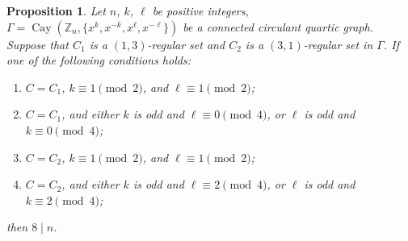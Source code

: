 \documentclass[12pt]{article}
\newtheorem{propA}{Proposition}[subsection]
\begin{document}
  \begin{propA}\label{prop:4-nkll}
  	Let $n$, $k$, $\ell$ be positive integers,
  	$\Gamma=\operatorname{Cay}(\mathbb{Z}_n,\{x^{k},x^{-k},x^{\ell},x^{-\ell}\})$
  	be a connected circulant quartic graph.  Suppose that $C_1$ is a $(1,3)$-regular set and $C_2$ is a $(3,1)$-regular set in $\Gamma$. If one of the following conditions holds:
  	\begin{enumerate}
  		\item[(i)] $C=C_1$, $k\equiv1\pmod{2}$, and $\ell\equiv1\pmod{2}$;
  		
  		\item[(ii)] $C=C_1$, and either $k$ is odd and $\ell\equiv0\pmod{4}$, or $\ell$ is odd and $k\equiv0\pmod{4}$;
  		
  		\item[(iii)] $C=C_2$, $k\equiv1\pmod{2}$, and $\ell\equiv1\pmod{2}$;
  		
  		\item[(iv)] $C=C_2$, and either $k$ is odd and $\ell\equiv2\pmod{4}$, or $\ell$ is odd and $k\equiv2\pmod{4}$;
  	\end{enumerate}
  	then $8\mid n$.
  	\end{propA}	
\end{document}
